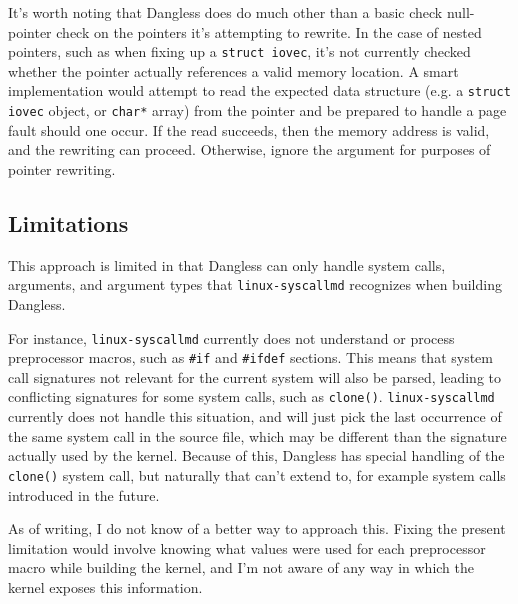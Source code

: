 
It's worth noting that Dangless does do much other than a basic check null-pointer check on the pointers it's attempting to rewrite. In the case of nested pointers, such as when fixing up a \lstinline!struct iovec!, it's not currently checked whether the pointer actually references a valid memory location. 
A smart implementation would attempt to read the expected data structure (e.g. a \lstinline!struct iovec! object, or \lstinline!char*! array) from the pointer and be prepared to handle a page fault should one occur. If the read succeeds, then the memory address is valid, and the rewriting can proceed. Otherwise, ignore the argument for purposes of pointer rewriting. 

\subsection{Limitations}

This approach is limited in that Dangless can only handle system calls, arguments, and argument types that \texttt{linux-syscallmd} recognizes when building Dangless.

For instance, \texttt{linux-syscallmd} currently does not understand or process preprocessor macros, such as \lstinline!#if! and \lstinline!#ifdef! sections. This means that system call signatures not relevant for the current system will also be parsed, leading to conflicting signatures for some system calls, such as \lstinline!clone()!. \texttt{linux-syscallmd} currently does not handle this situation, and will just pick the last occurrence of the same system call in the source file, which may be different than the signature actually used by the kernel. Because of this, Dangless has special handling of the \lstinline!clone()! system call, but naturally that can't extend to, for example system calls introduced in the future.

As of writing, I do not know of a better way to approach this. Fixing the present limitation would involve knowing what values were used for each preprocessor macro while building the kernel, and I'm not aware of any way in which the kernel exposes this information.

